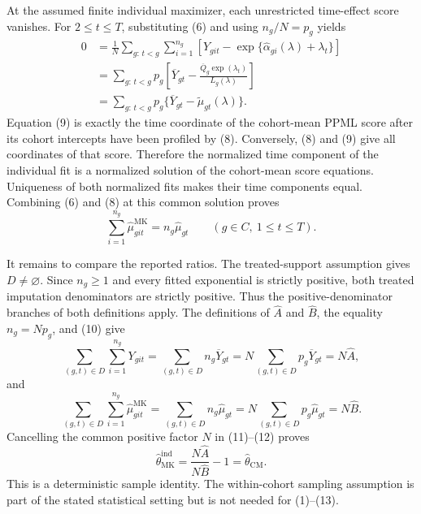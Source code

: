 At the assumed finite individual maximizer, each unrestricted time-effect score vanishes.  For \(2\le t\le T\), substituting (6) and using \(n_g/N=p_g\) yields
\[
\begin{aligned}
0
&=\frac1N\sum_{g:\,t<g}\sum_{i=1}^{n_g}
\left[Y_{git}-
\exp\{\widehat\alpha_{gi}(\lambda)+\lambda_t\}\right]\\
&=\sum_{g:\,t<g}p_g
\left[\overline Y_{gt}-
\frac{\overline Q_g\exp(\lambda_t)}{L_g(\lambda)}\right]\\
&=\sum_{g:\,t<g}p_g
\{\overline Y_{gt}-\widetilde\mu_{gt}(\lambda)\}.
\end{aligned}
\tag{9}
\]
Equation (9) is exactly the time coordinate of the cohort-mean PPML score after its cohort intercepts have been profiled by (8).  Conversely, (8) and (9) give all coordinates of that score.  Therefore the normalized time component of the individual fit is a normalized solution of the cohort-mean score equations.  Uniqueness of both normalized fits makes their time components equal.  Combining (6) and (8) at this common solution proves
\[
\sum_{i=1}^{n_g}\widehat\mu^{\mathrm{MK}}_{git}
=n_g\widehat\mu_{gt}
\qquad(g\in C,\ 1\le t\le T).
\tag{10}
\]

It remains to compare the reported ratios.  The treated-support assumption gives \(D\ne\varnothing\).  Since \(n_g\ge1\) and every fitted exponential is strictly positive, both treated imputation denominators are strictly positive.  Thus the positive-denominator branches of both definitions apply.  The definitions of \(\widehat A\) and \(\widehat B\), the equality \(n_g=Np_g\), and (10) give
\[
\sum_{(g,t)\in D}\sum_{i=1}^{n_g}Y_{git}
=\sum_{(g,t)\in D}n_g\overline Y_{gt}
=N\sum_{(g,t)\in D}p_g\overline Y_{gt}
=N\widehat A,
\tag{11}
\]
and
\[
\sum_{(g,t)\in D}\sum_{i=1}^{n_g}
\widehat\mu^{\mathrm{MK}}_{git}
=\sum_{(g,t)\in D}n_g\widehat\mu_{gt}
=N\sum_{(g,t)\in D}p_g\widehat\mu_{gt}
=N\widehat B.
\tag{12}
\]
Cancelling the common positive factor \(N\) in (11)--(12) proves
\[
\widehat\theta_{\mathrm{MK}}^{\mathrm{ind}}
=\frac{N\widehat A}{N\widehat B}-1
=\widehat\theta_{\mathrm{CM}}.
\tag{13}
\]
This is a deterministic sample identity.  The within-cohort sampling assumption is part of the stated statistical setting but is not needed for (1)--(13).

